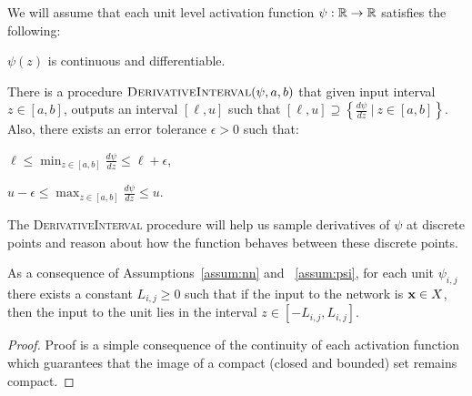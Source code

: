 \begin{assumption}\label{assum:psi}
    We will assume that each unit level activation function 
    $\psi: \mathbb{R} \rightarrow \mathbb{R}$ satisfies the following:
    \begin{compactenum}
	\item $\psi(z)$ is continuous and differentiable.
	\item  There is a procedure $\textsc{DerivativeInterval}(\psi, a, b)$ that given input interval $z \in [a, b]$, outputs an interval $[\ell, u]$ such that 
    $[\ell, u] \supseteq \left\{ \frac{d\psi}{dz}\ |\ z \in [a, b]\right\}$. Also, there exists an error tolerance $\epsilon > 0$ such that:
	\begin{inparaenum}
		\item  $\ell \leq \min_{z \in [a, b]} \frac{d\psi}{dz} \leq \ell + \epsilon$,
		\item $u - \epsilon \leq \max_{z \in [a,b]} \frac{d\psi}{dz} \leq u$.
	\end{inparaenum}
    The \textsc{DerivativeInterval} procedure will help us sample derivatives of $\psi$ at discrete points and reason about how the function behaves between these discrete points. 
    \end{compactenum}
\end{assumption}

\begin{lemma}\label{lemma:unit-input-bound}
As a consequence of Assumptions~\ref{assum:nn} and ~\ref{assum:psi}, for each unit $\psi_{i,j}$ there exists a constant $L_{i,j} \geq 0$ such that if the input to the network is $\mathbf{x} \in X$, then the input to the unit lies in the interval  $z \in [-L_{i,j}, L_{i,j}]$.
\end{lemma}
\begin{proof}
Proof is a simple consequence of the continuity of each activation function which guarantees that the image of a compact (closed and bounded) set remains compact. 
\end{proof}


